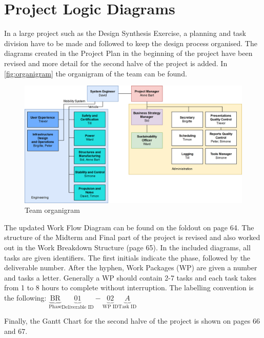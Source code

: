 \newpage
\chapter{Project Logic Diagrams}
\label{ch-diagrams}

In a large project such as the Design Synthesis Exercise, a planning and task division have to be made and followed to keep the design process organised. The diagrams created in the Project Plan in the beginning of the project have been revised and more detail for the second halve of the project is added. In \autoref{fig:organigram} the organigram of the team can be found. 



\begin{figure}[h]
    \centering
    \includegraphics[width=0.9\linewidth]{Figures/organigram.png}
    \captionsetup{justification=centering}
    \caption{Team organigram}
    \label{fig:organigram}
\end{figure}



The updated Work Flow Diagram can be found on the foldout on page 64. The structure of the Midterm and Final part of the project is revised and also worked out in the Work Breakdown Structure (page 65). In the included diagrams, all tasks are given identifiers. The first initials indicate the phase, followed by the deliverable number. After the hyphen, Work Packages (WP) are given a number and tasks a letter. Generally a WP should contain 2-7 tasks and each task takes from 1 to 8 hours to complete without interruption. The labelling convention is the following: $\underbrace{\text{BR}}_\text{Phase}\underbrace{01}_\text{Deliverable ID}-\underbrace{02}_\text{WP ID}\underbrace{A}_\text{Task ID}$ 

Finally, the Gantt Chart for the second halve of the project is shown on pages 66 and 67.

%  

%


%

%


